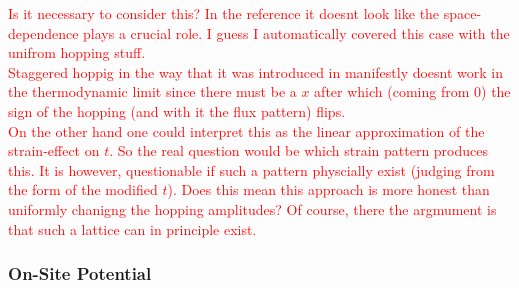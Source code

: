\documentclass[../../../main.tex]{subfiles}
\begin{document}
\textcolor{red}{Is it necessary to consider this? In the reference \cite{Sun2023} it doesnt look like the space-dependence plays a crucial role. I guess I automatically covered this case with the unifrom hopping stuff.} \\

\textcolor{red}{Staggered hoppig in the way that it was introduced in \cite{Sun2023} manifestly doesnt work in the thermodynamic limit since there must be a $x$ after which (coming from 0) the sign of the hopping (and with it the flux pattern) flips.} \\

\textcolor{red}{On the other hand one could interpret this as the linear approximation of the strain-effect on $t$. So the real question would be which strain pattern produces this. It is however, questionable if such a pattern physcially exist (judging from the form of the modified $t$). Does this mean this approach is more honest than uniformly chanigng the hopping amplitudes? Of course, there the argmument is that such a lattice can in principle exist.}

\subsubsection{On-Site Potential}
\end{document}

